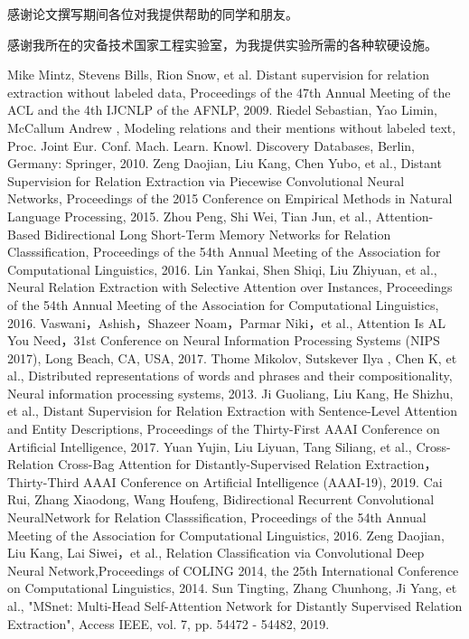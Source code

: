 \documentclass[UTF8]{csoarticle}
\begin{document}
感谢论文撰写期间各位对我提供帮助的同学和朋友。

感谢我所在的灾备技术国家工程实验室，为我提供实验所需的各种软硬设施。

\begin{thebibliography}{15}
     Mike Mintz, Stevens Bills, Rion Snow, et al. Distant supervision for relation extraction without labeled data, Proceedings of the 47th Annual Meeting of the ACL and the 4th IJCNLP of the AFNLP, 2009.
     Riedel Sebastian, Yao Limin, McCallum Andrew , Modeling relations and their mentions without labeled text, Proc. Joint Eur. Conf. Mach. Learn. Knowl. Discovery Databases, Berlin, Germany: Springer, 2010.
     Zeng Daojian, Liu Kang, Chen Yubo, et al., Distant Supervision for Relation Extraction via Piecewise Convolutional Neural Networks, Proceedings of the 2015 Conference on Empirical Methods in Natural Language Processing, 2015.
     Zhou Peng, Shi Wei, Tian Jun, et al.,  Attention-Based Bidirectional Long Short-Term Memory Networks for Relation Classsification, Proceedings of the 54th Annual Meeting of the Association for Computational Linguistics, 2016.
     Lin Yankai, Shen Shiqi, Liu Zhiyuan, et al., Neural Relation Extraction with Selective Attention over Instances, Proceedings of the 54th Annual Meeting of the Association for Computational Linguistics, 2016.
     Vaswani，Ashish，Shazeer Noam，Parmar Niki，et al., Attention Is AL You Need，31st Conference on Neural Information Processing Systems (NIPS 2017), Long Beach, CA, USA, 2017.
     Thome Mikolov, Sutskever Ilya , Chen K, et al., Distributed representations of words and phrases and their compositionality, Neural information processing systems, 2013.
     Ji Guoliang, Liu Kang, He Shizhu, et al., Distant Supervision for Relation Extraction with Sentence-Level Attention and Entity Descriptions, Proceedings of the Thirty-First AAAI Conference on Artificial Intelligence, 2017.
     Yuan Yujin, Liu Liyuan, Tang Siliang, et al., Cross-Relation Cross-Bag Attention for Distantly-Supervised Relation Extraction，Thirty-Third AAAI Conference on Artificial Intelligence (AAAI-19), 2019.
     Cai Rui, Zhang Xiaodong, Wang Houfeng, Bidirectional Recurrent Convolutional NeuralNetwork for Relation Classsification, Proceedings of the 54th Annual Meeting of the Association for Computational Linguistics, 2016.
     Zeng Daojian, Liu Kang, Lai Siwei，et al., Relation Classification via Convolutional Deep Neural Network,Proceedings of COLING 2014, the 25th International Conference on Computational Linguistics, 2014.
     Sun Tingting, Zhang Chunhong, Ji Yang, et al., "MSnet: Multi-Head Self-Attention Network for Distantly Supervised Relation Extraction", Access IEEE, vol. 7, pp. 54472 - 54482, 2019.
    
\end{thebibliography}
\end{document}
